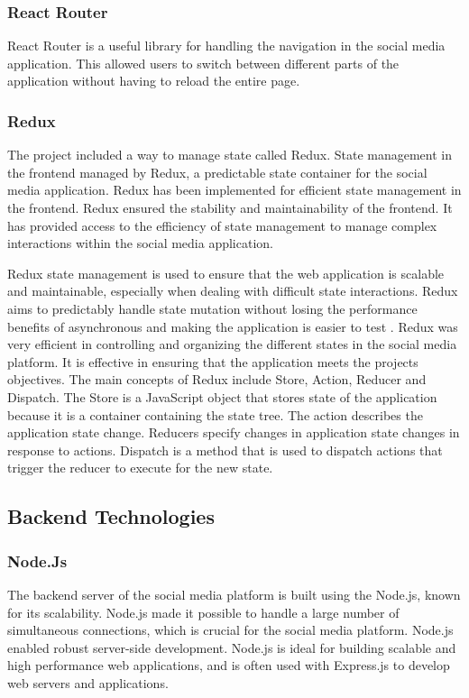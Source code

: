 \subsubsection{React Router}
React Router is a useful library for handling the navigation in the social media application. This allowed users to switch between different parts of the application without having to reload the entire page.

\subsubsection{Redux}
The project included a way to manage state called Redux. State management in the frontend managed by Redux, a predictable state container for the social media application. Redux has been implemented for efficient state management in the frontend. Redux ensured the stability and maintainability of the frontend. It has provided access to the efficiency of state management to manage complex interactions within the social media application.

Redux state management is used to ensure that the web application is scalable and maintainable, especially when dealing with difficult state interactions. Redux aims to predictably handle state mutation without losing the performance benefits of asynchronous and making the application is easier to test \cite{bugl2017learning}. Redux was very efficient in controlling and organizing the different states in the social media platform. It is effective in ensuring that the application meets the projects objectives. The main concepts of Redux include Store, Action, Reducer and Dispatch. The Store is a JavaScript object that stores state of the application because it is a container containing the state tree. The action describes the application state change. Reducers specify changes in application state changes in response to actions. Dispatch is a method that is used to dispatch actions that trigger the reducer to execute for the new state.

\subsection{Backend Technologies}
\subsubsection{Node.Js}
The backend server of the social media platform is built using the Node.js, known for its scalability. Node.js made it possible to handle a large number of simultaneous connections, which is crucial for the social media platform. Node.js enabled robust server-side development. Node.js is ideal for building scalable and high performance web applications, and  is often used with Express.js to develop web servers and applications. 

